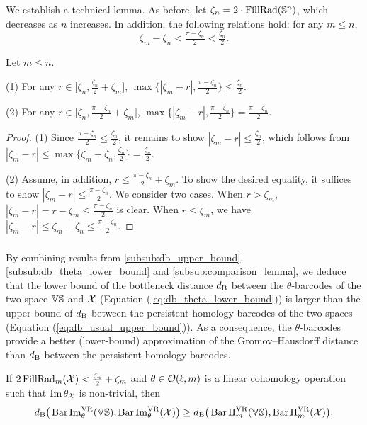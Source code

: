 We establish a technical lemma.
As before, let $\zeta_n = 2 \cdot \fillrad(\bS^n)$, which decreases as $n$ increases.
In addition, the following relations hold: for any $m \leq n$,
\[\zeta_m - \zeta_n < \tfrac{\pi - \zeta_n}{2} < \tfrac{\zeta_n}{2}.\]

\medskip\lemma
Let $m \leq n$.

(1) For any $r \in \big[\zeta_n, \tfrac{\zeta_n}{2}+\zeta_m\big]$, $\max\big\{|\zeta_m  - r |, \tfrac{\pi - \zeta_n}{2}\big\} \leq \tfrac{\zeta_n}{2}$.

(2) For any $r \in \big[\zeta_n, \tfrac{\pi - \zeta_n}{2} + \zeta_m\big]$, $\max\{|\zeta_m  - r |, \tfrac{\pi - \zeta_n}{2}\} = \tfrac{\pi - \zeta_n}{2}$.

\begin{proof}
    	(1) Since $\tfrac{\pi - \zeta_n}{2} \leq \tfrac{\zeta_n}{2}$, it remains to show $|\zeta_m  - r | \leq \tfrac{\zeta_n}{2}$, which follows from
    	\(
    	|\zeta_m  - r | \leq \max\big\{\zeta_m - \zeta_n, \tfrac{\zeta_n}{2}\big\} = \tfrac{\zeta_n}{2}.
    	\)

    	(2) Assume, in addition, $r \leq \tfrac{\pi - \zeta_n}{2} + \zeta_m$.
        To show the desired equality, it suffices to show $|\zeta_m  - r | \leq \tfrac{\pi - \zeta_n}{2}$.
        We consider two cases.
        When $r > \zeta_m$,
    	$|\zeta_m  - r | = r - \zeta_m \leq
        \tfrac{\pi - \zeta_n}{2}
    	$ is clear.
    	When $r \leq \zeta_m$, we have
    	\(
    	|\zeta_m  - r | \leq \zeta_m - \zeta_n
    	\leq \tfrac{\pi - \zeta_n}{2}.
    	\)
\end{proof}

\subsubsection{}
By combining results from \cref{subsub:db_upper_bound}, \cref{subsub:db_theta_lower_bound} and \cref{subsub:comparison_lemma}, we deduce that the lower bound of the bottleneck distance $\db$ between the $\theta$-barcodes of the two space $\VS$ and $\cX$ (Equation (\ref{eq:db_theta_lower_bound})) is larger than the upper bound of $\db$ between the persistent homology barcodes of the two spaces (Equation (\ref{eq:db_usual_upper_bound})).
As a consequence, the $\theta$-barcodes provide a better (lower-bound) approximation of the Gromov--Hausdorff distance than $\db$ between the persistent homology barcodes.

\medskip\proposition
If $2\firstdeath{m}{\cX} < \tfrac{\zeta_n}{2}+\zeta_m$ and $\theta \in \cO(\ell, m)$ is a linear cohomology operation such that $\img \theta_\cX$ is non-trivial, then
\[\db\big(\thetabarc{\VS}, \thetabarc{\cX}\big) \geq \db\big(\Hbarc[\field]{m}{\VS}, \Hbarc[\field]{m}{\cX}\big).\]

